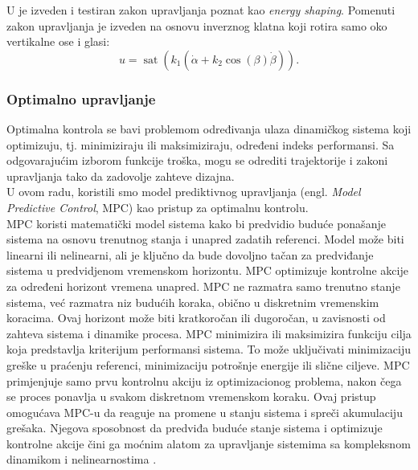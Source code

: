 \documentclass[a4paper,11pt]{article}
\theoremstyle{definition} \newtheorem{deff}{Definicija}[section]
\theoremstyle{definition} \newtheorem{prim}[deff]{Primer}
\theoremstyle{plain} \newtheorem{teor}[deff]{Teorema}
\begin{document}
	U \cite{ener_shaping} je izveden i testiran zakon upravljanja poznat kao \textit{energy shaping}. Pomenuti zakon upravljanja je izveden na osnovu inverznog klatna koji rotira samo oko vertikalne ose i glasi: \\
	
	\begin{equation}
		u = \operatorname{sat}(k_1 (\dot\alpha + k_2 \cos(\beta) \dot\beta)).
	\end{equation}
	
	\subsubsection{Optimalno upravljanje}
	Optimalna kontrola se bavi problemom određivanja ulaza dinamičkog sistema koji optimizuju, tj. minimiziraju ili maksimiziraju, određeni indeks performansi. Sa odgovarajućim izborom funkcije troška, mogu se odrediti trajektorije i zakoni upravljanja tako da zadovolje zahteve dizajna.\\
	
	U ovom radu, koristili smo model prediktivnog upravljanja (engl. \emph{Model Predictive Control}, MPC) kao pristup za optimalnu kontrolu. \\
	
	MPC koristi matematički model sistema kako bi predvidio buduće ponašanje sistema na osnovu trenutnog stanja i unapred zadatih referenci. Model može biti linearni ili nelinearni, ali je ključno da bude dovoljno tačan za predviđanje sistema u predvidjenom vremenskom horizontu. MPC optimizuje kontrolne akcije za određeni horizont vremena unapred. MPC ne razmatra samo trenutno stanje sistema, već razmatra niz budućih koraka, obično u diskretnim vremenskim koracima. Ovaj horizont može biti kratkoročan ili dugoročan, u zavisnosti od zahteva sistema i dinamike procesa. MPC minimizira ili maksimizira funkciju cilja koja predstavlja kriterijum performansi sistema. To može uključivati minimizaciju greške u praćenju referenci, minimizaciju potrošnje energije ili slične ciljeve. MPC primjenjuje samo prvu kontrolnu akciju iz optimizacionog problema, nakon čega se proces ponavlja u svakom diskretnom vremenskom koraku. Ovaj pristup omogućava MPC-u da reaguje na promene u stanju sistema i spreči akumulaciju grešaka. Njegova sposobnost da predviđa buduće stanje sistema i optimizuje kontrolne akcije čini ga moćnim alatom za upravljanje sistemima sa kompleksnom dinamikom i nelinearnostima \cite{mpc}.\\
	
\end{document}

